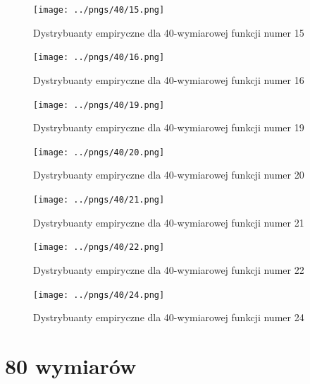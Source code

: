 \documentclass[a4paper,onecolumn,oneside,12pt,wide,floatssmall]{mwrep}
\theoremstyle{definition}
\theoremstyle{plain}%
\theoremstyle{remark}
\begin{document}
\begin{figure}[H]
\centering
\texttt{[image: ../pngs/40/15.png]}
\caption{Dystrybuanty empiryczne dla 40-wymiarowej funkcji numer 15}
\end{figure}

\begin{figure}[H]
\centering
\texttt{[image: ../pngs/40/16.png]} 
\caption{Dystrybuanty empiryczne dla 40-wymiarowej funkcji numer 16}
\end{figure}

\begin{figure}[H]
\centering
\texttt{[image: ../pngs/40/19.png]}
\caption{Dystrybuanty empiryczne dla 40-wymiarowej funkcji numer 19}
\end{figure}

\begin{figure}[H]
\centering
\texttt{[image: ../pngs/40/20.png]}
\caption{Dystrybuanty empiryczne dla 40-wymiarowej funkcji numer 20}
\end{figure}

\begin{figure}[H]
\centering
\texttt{[image: ../pngs/40/21.png]}
\caption{Dystrybuanty empiryczne dla 40-wymiarowej funkcji numer 21}
\end{figure}

\begin{figure}[H]
\centering
\texttt{[image: ../pngs/40/22.png]}
\caption{Dystrybuanty empiryczne dla 40-wymiarowej funkcji numer 22}
\end{figure}

\begin{figure}[H]
\centering
\texttt{[image: ../pngs/40/24.png]}
\caption{Dystrybuanty empiryczne dla 40-wymiarowej funkcji numer 24}
\end{figure}

\section{80 wymiarów}
\end{document}

